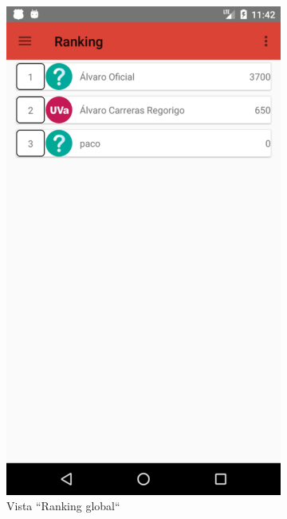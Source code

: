 \documentclass[twoside]{report}
\begin{document}
\begin{figure}[H]
\begin{center}
\begin{subfigure}[t]{.3\linewidth}
		\includegraphics[scale=0.25]{images/userguide/12.png}
		\caption{Vista “Ranking global“}
	\end{subfigure}\hspace{2mm}%
	\begin{subfigure}[t]{.3\linewidth}

\end{subfigure}
\end{center}
\end{figure}
\end{document}
